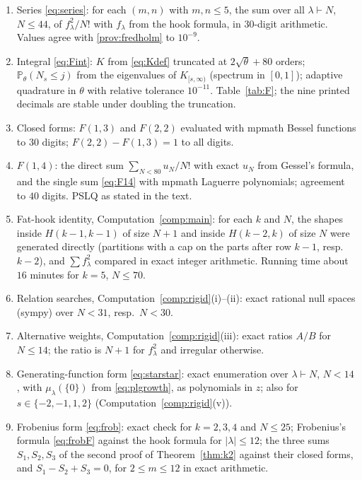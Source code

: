\documentclass[11pt]{article}
\theoremstyle{definition}
\theoremstyle{remark}
\newcommand{\Prob}{\mathbb{P}}
\begin{document}
\begin{enumerate}[label=(P\arabic*),leftmargin=3em]
\item\label{prov:series} Series \eqref{eq:series}: for each $(m,n)$ with $m,n\le5$, the sum over all $\lambda\vdash N$, $N\le44$, of $f_\lambda^2/N!$ with $f_\lambda$ from the hook formula, in $30$-digit arithmetic. Values agree with \ref{prov:fredholm} to $10^{-9}$.
\item\label{prov:fredholm} Integral \eqref{eq:Fint}: $K$ from \eqref{eq:Kdef} truncated at $2\sqrt\theta+80$ orders; $\Prob_\theta(N_s\le j)$ from the eigenvalues of $K_{[s,\infty)}$ (spectrum in $[0,1]$); adaptive quadrature in $\theta$ with relative tolerance $10^{-11}$. Table~\ref{tab:F}; the nine printed decimals are stable under doubling the truncation.
\item Closed forms: $F(1,3)$ and $F(2,2)$ evaluated with mpmath Bessel functions to $30$ digits; $F(2,2)-F(1,3)=1$ to all digits.
\item $F(1,4)$: the direct sum $\sum_{N<80}u_N/N!$ with exact $u_N$ from Gessel's formula, and the single sum \eqref{eq:F14} with mpmath Laguerre polynomials; agreement to $40$ digits. PSLQ as stated in the text.
\item Fat-hook identity, Computation~\ref{comp:main}: for each $k$ and $N$, the shapes inside $H(k-1,k-1)$ of size $N+1$ and inside $H(k-2,k)$ of size $N$ were generated directly (partitions with a cap on the parts after row $k-1$, resp.\ $k-2$), and $\sum f_\lambda^2$ compared in exact integer arithmetic. Running time about $16$ minutes for $k=5$, $N\le70$.
\item Relation searches, Computation~\ref{comp:rigid}(i)--(ii): exact rational null spaces (sympy) over $N<31$, resp.\ $N<30$.
\item Alternative weights, Computation~\ref{comp:rigid}(iii): exact ratios $A/B$ for $N\le14$; the ratio is $N+1$ for $f_\lambda^2$ and irregular otherwise.
\item Generating-function form \eqref{eq:starstar}: exact enumeration over $\lambda\vdash N$, $N<14$, with $\mu_\lambda(\{0\})$ from \eqref{eq:plgrowth}, as polynomials in $z$; also for $s\in\{-2,-1,1,2\}$ (Computation~\ref{comp:rigid}(v)).
\item Frobenius form \eqref{eq:frob}: exact check for $k=2,3,4$ and $N\le25$; Frobenius's formula \eqref{eq:frobF} against the hook formula for $|\lambda|\le12$; the three sums $S_1,S_2,S_3$ of the second proof of Theorem~\ref{thm:k2} against their closed forms, and $S_1-S_2+S_3=0$, for $2\le m\le12$ in exact arithmetic.

\end{enumerate}
\end{document}
